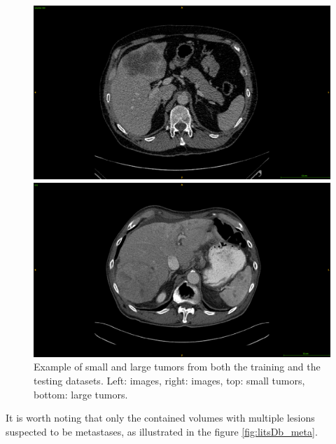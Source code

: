 {\begin{figure}[!ht]
\begin{mdframed}[backgroundcolor=blue!50,linecolor=blue!50]
\begin{minipage}{0.45\linewidth}
		\end{minipage} \\
		\begin{minipage}{0.45\linewidth}
			\includegraphics[width=\linewidth]{images/LITS_examplePatientLargeTumor}
		\end{minipage} \hspace{-0.1cm}
		\begin{minipage}{0.45\linewidth}
			\includegraphics[width=\linewidth]{images/TCIA_examplePatientLargeTumor}
		\end{minipage}
	\end{mdframed}
	\caption{Example of small and large tumors from both the training and the testing datasets. Left: \textbf{} images, right: \textbf{} images, top: small tumors, bottom: large tumors.}
	\label{fig:interdb_tumorExamples}
\end{figure}
It is worth noting that only the \textbf{} contained volumes with multiple lesions suspected to be metastases, as illustrated in the figure \ref{fig:litsDb_meta}.
}
